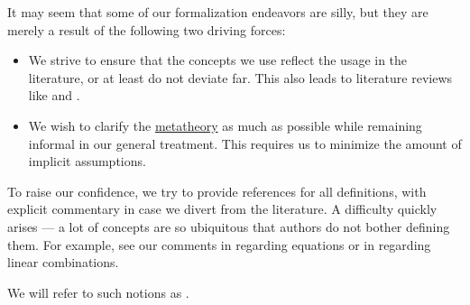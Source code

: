 \begin{concept}\label{con:assumed_knowledge}
  It may seem that some of our formalization endeavors are silly, but they are merely a result of the following two driving forces:
  \begin{itemize}
    \item We strive to ensure that the concepts we use reflect the usage in the literature, or at least do not deviate far. This also leads to literature reviews like  and .

    \item We wish to clarify the \hyperref[con:metalogic]{metatheory} as much as possible while remaining informal in our general treatment. This requires us to minimize the amount of implicit assumptions.
  \end{itemize}

  To raise our confidence, we try to provide references for all definitions, with explicit commentary in case we divert from the literature. A difficulty quickly arises --- a lot of concepts are so ubiquitous that authors do not bother defining them. For example, see our comments in  regarding equations or in  regarding linear combinations.

  We will refer to such notions as .
\end{concept}
